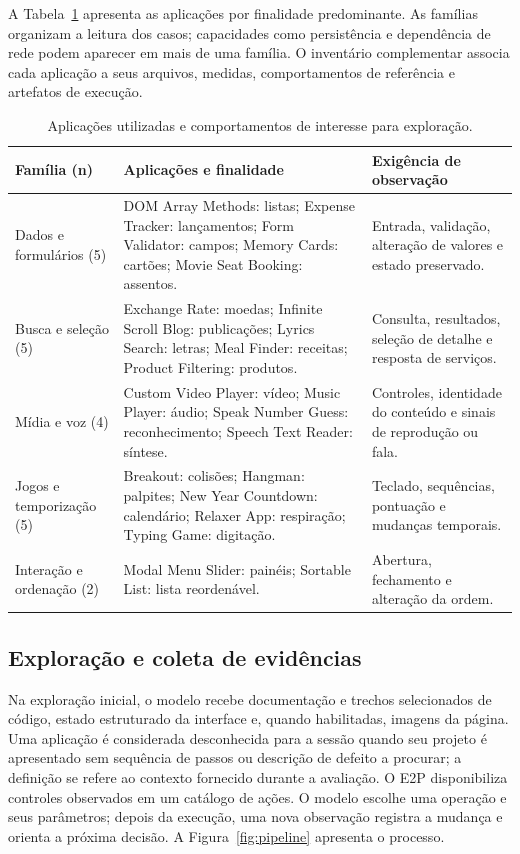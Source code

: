 \documentclass[12pt]{article}
\begin{document}
A Tabela~\ref{tab:corpus} apresenta as aplicações por finalidade predominante. As famílias organizam a leitura dos casos; capacidades como persistência e dependência de rede podem aparecer em mais de uma família. O inventário complementar associa cada aplicação a seus arquivos, medidas, comportamentos de referência e artefatos de execução.

\begin{table}[ht]
\centering
\caption{Aplicações utilizadas e comportamentos de interesse para exploração.}
\label{tab:corpus}
\footnotesize
\begin{tabular}{>{\raggedright\arraybackslash}p{2.6cm}>{\raggedright\arraybackslash}p{6.4cm}>{\raggedright\arraybackslash}p{4.5cm}}
\toprule
Família (n) & Aplicações e finalidade & Exigência de observação\\
\midrule
Dados e formulários (5) & DOM Array Methods: listas; Expense Tracker: lançamentos; Form Validator: campos; Memory Cards: cartões; Movie Seat Booking: assentos. & Entrada, validação, alteração de valores e estado preservado.\\
Busca e seleção (5) & Exchange Rate: moedas; Infinite Scroll Blog: publicações; Lyrics Search: letras; Meal Finder: receitas; Product Filtering: produtos. & Consulta, resultados, seleção de detalhe e resposta de serviços.\\
Mídia e voz (4) & Custom Video Player: vídeo; Music Player: áudio; Speak Number Guess: reconhecimento; Speech Text Reader: síntese. & Controles, identidade do conteúdo e sinais de reprodução ou fala.\\
Jogos e temporização (5) & Breakout: colisões; Hangman: palpites; New Year Countdown: calendário; Relaxer App: respiração; Typing Game: digitação. & Teclado, sequências, pontuação e mudanças temporais.\\
Interação e ordenação (2) & Modal Menu Slider: painéis; Sortable List: lista reordenável. & Abertura, fechamento e alteração da ordem.\\
\bottomrule
\end{tabular}
\end{table}

\subsection{Exploração e coleta de evidências}
Na exploração inicial, o modelo recebe documentação e trechos selecionados de código, estado estruturado da interface e, quando habilitadas, imagens da página. Uma aplicação é considerada desconhecida para a sessão quando seu projeto é apresentado sem sequência de passos ou descrição de defeito a procurar; a definição se refere ao contexto fornecido durante a avaliação. O E2P disponibiliza controles observados em um catálogo de ações. O modelo escolhe uma operação e seus parâmetros; depois da execução, uma nova observação registra a mudança e orienta a próxima decisão. A Figura~\ref{fig:pipeline} apresenta o processo.
\end{document}
